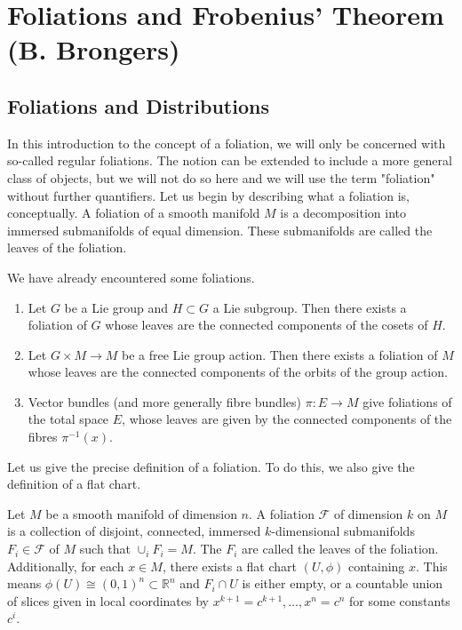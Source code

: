 \chapter{Foliations and Frobenius' Theorem (B. Brongers)}\label{appendix:frobenius}

\section{Foliations and Distributions}

In this introduction to the concept of a foliation, we will only be concerned with so-called regular foliations. The notion can be extended to include a more general class of objects, but we will not do so here and we will use the term "foliation" without further quantifiers. Let us begin by describing what a foliation is, conceptually. A foliation of a smooth manifold $M$ is a decomposition into immersed submanifolds of equal dimension. These submanifolds are called the leaves of the foliation.
\begin{example}
  We have already encountered some foliations.
  \begin{enumerate}
    \item Let $G$ be a Lie group and $H\subset G$ a Lie subgroup. Then there exists a foliation of $G$ whose leaves are the connected components of the cosets of $H$.
    \item Let $G\times M\to M$ be a free Lie group action. Then there exists a foliation of $M$ whose leaves are the connected components of the orbits of the group action.
    \item Vector bundles (and more generally fibre bundles) $\pi:E\to M$ give foliations of the total space $E$, whose leaves are given by the connected components of the fibres $\pi^{-1}(x)$.
  \end{enumerate}
\end{example}
Let us give the precise definition of a foliation. To do this, we also give the definition of a flat chart.
\begin{definition}
  Let $M$ be a smooth manifold of dimension $n$. A foliation $\mathcal{F}$ of dimension $k$ on $M$ is a collection of disjoint, connected, immersed $k$-dimensional submanifolds $F_i\in\mathcal{F}$ of $M$ such that $\cup_iF_i=M$. The $F_i$ are called the leaves of the foliation. Additionally, for each $x\in M$, there exists a flat chart $(U,\phi)$ containing $x$. This means $\phi(U)\cong (0,1)^n\subset\mathbb{R}^n$ and $F_i\cap U$ is either empty, or a countable union of slices given in local coordinates by $x^{k+1}=c^{k+1},\dots,x^n=c^n$ for some constants $c^i$.
\end{definition}
